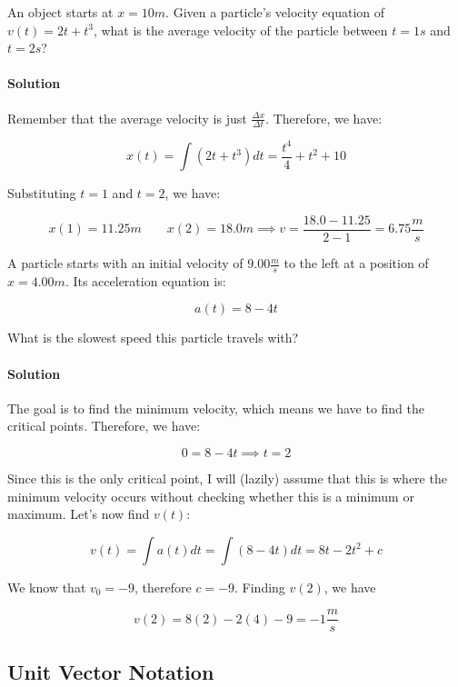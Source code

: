 \documentclass{scrartcl}
\theoremstyle{definition}
\begin{document}
	\begin{example}
		An object starts at $x=10m$. Given a particle's velocity equation of $v(t) = 2t+t^3$, what is the average velocity of the particle between $t=1s$ and $t=2s$?
	\end{example}
	
	\paragraph{Solution} Remember that the average velocity is just $\frac{\Delta x}{\Delta t}$. Therefore, we have:
	
	$$
	x(t) = \int (2t+t^3)dt = \frac{t^4}{4} + t^2 + 10
	$$
	
	\noindent Substituting $t=1$ and $t=2$, we have:
	
	$$
	x(1) = 11.25m \quad \quad x(2) = 18.0m \implies v = \frac{18.0 - 11.25}{2 - 1} = 6.75 \frac{m}{s}
	$$
	
	\begin{example}
		A particle starts with an initial velocity of $9.00 \frac{m}{s}$ to the left at a position of $x = 4.00m$. Its acceleration equation is:
		
		$$
		a(t) = 8-4t
		$$
		
		\noindent What is the slowest speed this particle travels with?
	\end{example}
	
	\paragraph{Solution} The goal is to find the minimum velocity, which means we have to find the critical points. Therefore, we have:
	
	$$
	0 = 8 - 4t \implies t = 2
	$$
	
	\noindent Since this is the only critical point, I will (lazily) assume that this is where the minimum velocity occurs without checking whether this is a minimum or maximum. Let's now find $v(t)$:
	
	$$
	v(t) = \int a(t) dt = \int (8-4t)dt = 8t - 2t^2 + c
	$$
	
	\noindent We know that $v_0 = -9$, therefore $c = -9$. Finding $v(2)$, we have
	
	$$
	v(2) = 8(2) - 2(4) - 9 = -1 \frac{m}{s}
	$$
	
	\subsection{Unit Vector Notation}
	
\end{document}

